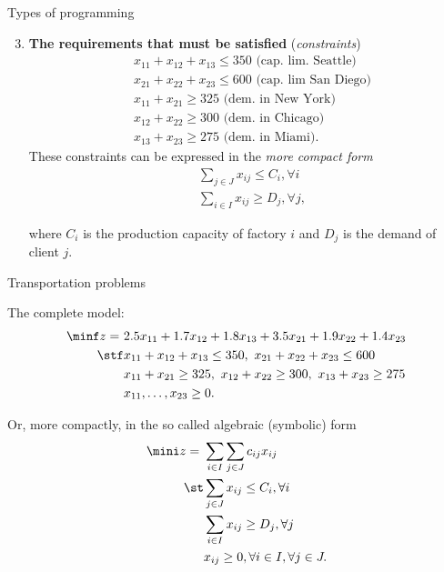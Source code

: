 \begin{frame}{Types of programming}
\begin{enumerate}
\setcounter{enumi}{2}
\item {\bf The requirements that must be satisfied} ({\it constraints})
%
\begin{align*}
&x_{11} + x_{12} + x_{13} \leq 350 \text{ (cap. lim. Seattle)}\\
&x_{21} + x_{22} + x_{23} \leq 600 \text{ (cap. lim San Diego)}\\
&x_{11} + x_{21} \geq 325 \text{ (dem. in New York)}\\
&x_{12} + x_{22} \geq 300 \text{ (dem. in Chicago)}\\
&x_{13} + x_{23} \geq 275 \text{ (dem. in Miami)}.
\end{align*}
%
These constraints can be expressed in the \emph{more compact form}
%
\begin{align*}
&\sum_{j \in J} x_{ij} \leq C_i, \forall i \\
&\sum_{i \in I} x_{ij} \geq D_j, \forall j,
\end{align*}

where $C_i$ is the production capacity of factory $i$ and $D_j$ is the demand of client $j$.
\end{enumerate}



Transportation problems

The complete model:
\begin{align*}
\minf z = \ &2.5x_{11} + 1.7x_{12} + 1.8x_{13} + 3.5x_{21} + 1.9x_{22} + 1.4x_{23} \\
\stf &x_{11} + x_{12} + x_{13} \leq 350, \ 
x_{21} + x_{22} + x_{23} \leq 600\\
&x_{11} + x_{21} \geq 325, \ x_{12} + x_{22} \geq 300, \ x_{13} + x_{23} \geq 275\\
&x_{11}, \dots, x_{23} \geq 0.
\end{align*}
%

Or, more compactly, in the so called \alert{algebraic (symbolic) form}
%
\begin{align*}
\mini z = \ &\sum_{i \in I}\sum_{j \in J}c_{ij}x_{ij}\\
\st & \sum_{j \in J} x_{ij} \leq C_i, \forall i\\
& \sum_{i \in I} x_{ij} \geq D_j, \forall j\\
&x_{ij} \geq 0, \forall i \in I, \forall j \in J.
\end{align*}

\end{frame}



